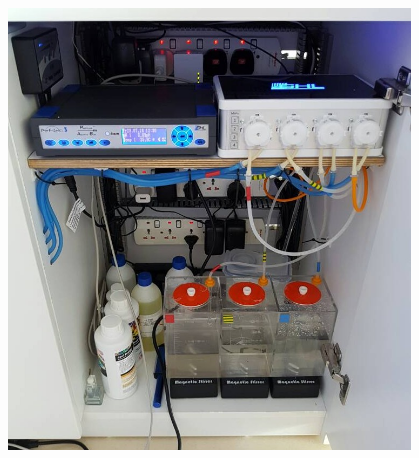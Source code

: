 \documentclass[%
  12pt,       				%
	t,                  %
	aspectratio=1610,   %
	unicode,						%
]{beamer}				    	%
\begin{document}
\begin{frame}[fragile]
\begin{columns}[T]
\begin{column}{0.5\textwidth}
		\end{column}
		\begin{column}{0.5\textwidth}		%
			\begin{figure}%
				\centering
				\vspace{-0.8cm}	              %
				\includegraphics[width=\columnwidth]{obrazky/prezentace/ghl-from-forum.jpg}
			\end{figure}
		\end{column}
	\end{columns}											%
\end{frame}
\end{document}

